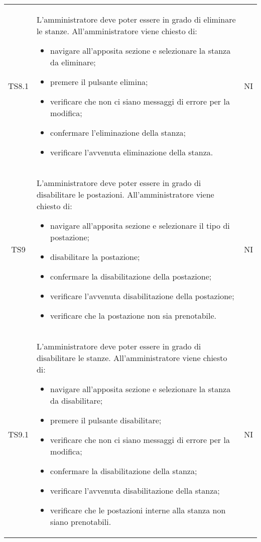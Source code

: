{\begin{longtable}{ c C{11cm} c }
        TS8.1&
        \begin{flushleft}
            L'amministratore deve poter essere in grado di eliminare le stanze.
            All'amministratore viene chiesto di:
        \end{flushleft}
        \begin{itemize}
            \item navigare all'apposita sezione e selezionare la stanza da eliminare;
            \item premere il pulsante elimina;
            \item verificare che non ci siano messaggi di errore per la modifica;
            \item confermare l'eliminazione della stanza;
            \item verificare l'avvenuta eliminazione della stanza.
        \end{itemize}&
        NI\\

        TS9&
        \begin{flushleft}
            L'amministratore deve poter essere in grado di disabilitare le postazioni.
            All'amministratore viene chiesto di:
        \end{flushleft}
        \begin{itemize}
            \item navigare all'apposita sezione e selezionare il tipo di postazione;
            \item disabilitare la postazione;
            \item confermare la disabilitazione della postazione;
            \item verificare l'avvenuta disabilitazione della postazione;
            \item verificare che la postazione non sia prenotabile.
        \end{itemize}&
        NI\\

        TS9.1&
        \begin{flushleft}
            L'amministratore deve poter essere in grado di disabilitare le stanze.
            All'amministratore viene chiesto di:
        \end{flushleft}
        \begin{itemize}
            \item navigare all'apposita sezione e selezionare la stanza da disabilitare;
            \item premere il pulsante disabilitare;
            \item verificare che non ci siano messaggi di errore per la modifica;
            \item confermare la disabilitazione della stanza;
            \item verificare l'avvenuta disabilitazione della stanza;
            \item verificare che le postazioni interne alla stanza non siano prenotabili.
        \end{itemize}&
        NI\\



\end{longtable}}
